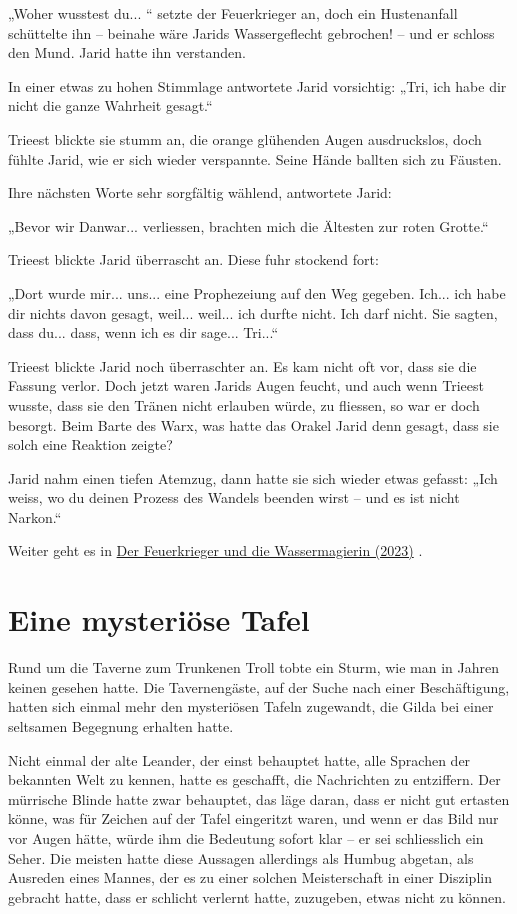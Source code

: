 \documentclass[10pt, a4paper, oneside]{book}
\newcommand{\hypref}[1]{%
    \hyperref[#1]{#1}%
}
\begin{document}
„Woher wusstest du... “ setzte der Feuerkrieger an, doch ein Hustenanfall schüttelte ihn – beinahe wäre Jarids Wassergeflecht gebrochen! – und er schloss den Mund. Jarid hatte ihn verstanden.

In einer etwas zu hohen Stimmlage antwortete Jarid vorsichtig: „Tri, ich habe dir nicht die ganze Wahrheit gesagt.“

Trieest blickte sie stumm an, die orange glühenden Augen ausdruckslos, doch fühlte Jarid, wie er sich wieder verspannte. Seine Hände ballten sich zu Fäusten.

Ihre nächsten Worte sehr sorgfältig wählend, antwortete Jarid:

„Bevor wir Danwar... verliessen, brachten mich die Ältesten zur roten Grotte.“

Trieest blickte Jarid überrascht an. Diese fuhr stockend fort:

„Dort wurde mir... uns... eine Prophezeiung auf den Weg gegeben. Ich... ich habe dir nichts davon gesagt, weil... weil... ich durfte nicht. Ich darf nicht. Sie sagten, dass du... dass, wenn ich es dir sage... Tri...“

Trieest blickte Jarid noch überraschter an. Es kam nicht oft vor, dass sie die Fassung verlor. Doch jetzt waren Jarids Augen feucht, und auch wenn Trieest wusste, dass sie den Tränen nicht erlauben würde, zu fliessen, so war er doch besorgt. Beim Barte des Warx, was hatte das Orakel Jarid denn gesagt, dass sie solch eine Reaktion zeigte?

Jarid nahm einen tiefen Atemzug, dann hatte sie sich wieder etwas gefasst: „Ich weiss, wo du deinen Prozess des Wandels beenden wirst – und es ist nicht Narkon.“

\begin{center}
    Weiter geht es in \hypref{Der Feuerkrieger und die Wassermagierin (2023)}.
\end{center}




\newpage
\section{Eine mysteriöse Tafel}

Rund um die Taverne zum Trunkenen Troll tobte ein Sturm, wie man in Jahren keinen gesehen hatte. Die Tavernengäste, auf der Suche nach einer Beschäftigung, hatten sich einmal mehr den mysteriösen Tafeln zugewandt, die Gilda bei einer seltsamen Begegnung erhalten hatte.

Nicht einmal der alte Leander, der einst behauptet hatte, alle Sprachen der bekannten Welt zu kennen, hatte es geschafft, die Nachrichten zu entziffern. Der mürrische Blinde hatte zwar behauptet, das läge daran, dass er nicht gut ertasten könne, was für Zeichen auf der Tafel eingeritzt waren, und wenn er das Bild nur vor Augen hätte, würde ihm die Bedeutung sofort klar – er sei schliesslich ein Seher. Die meisten hatte diese Aussagen allerdings als Humbug abgetan, als Ausreden eines Mannes, der es zu einer solchen Meisterschaft in einer Disziplin gebracht hatte, dass er schlicht verlernt hatte, zuzugeben, etwas nicht zu können.
\end{document}
